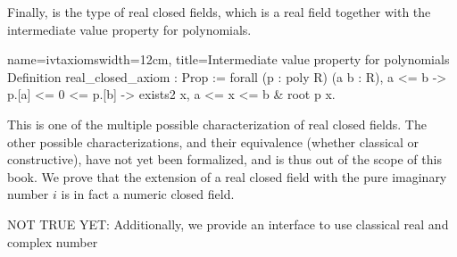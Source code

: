 Finally,  is the type of real closed fields, which is a
real field together with the intermediate value property for
polynomials.
\begin{coq}{name=ivtaxioms}{width=12cm, title=Intermediate value
    property for polynomials}
Definition real_closed_axiom : Prop :=
  forall (p : {poly R}) (a b : R),
    a <= b -> p.[a] <= 0 <= p.[b] -> exists2 x, a <= x <= b & root p x.
\end{coq}
This is one of the multiple possible characterization of real closed
fields. The other possible characterizations, and their equivalence
(whether classical or constructive), have not yet been formalized, and
is thus out of the scope of this book.  We prove that the extension of
a real closed field with the pure imaginary number $i$ is in fact a
numeric closed field.


NOT TRUE YET: Additionally, we provide an interface to use classical real and
complex number


